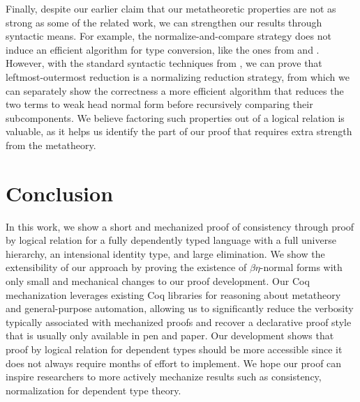 \documentclass[acmsmall,screen=true,
\ifpublic review=false\else,review=true\fi
  ,anonymous=\ifanonymous true\else false\fi]{acmart}
\newcommand{\scw}[1]{}
\newcommand{\yl}[1]{}
\begin{document}
\ifextended
Finally, despite our earlier claim that our metatheoretic properties
are not as strong as some of the related work, we can strengthen our
results through syntactic means. For example, the
normalize-and-compare strategy does not induce an efficient algorithm
for type conversion, like the ones from \citet{decagda} and
\citet{martin-lof-a-la-coq}. However, with the standard syntactic
techniques from \citet{takahashi-parallel-reduction,
factorization-essentially}, we can prove that leftmost-outermost
reduction is a normalizing reduction strategy, from which we can
separately show the correctness a more efficient algorithm that
reduces the two terms to weak head normal form before recursively
comparing their subcomponents. We believe factoring such properties
out of a logical relation is valuable, as it helps us identify the
part of our proof that requires extra strength from the metatheory.
\scw{Why don't we just use leftmost-outermost reduction in the first place?
Do we even need nondeterministic parallel reduction?}
\yl{The conversion uses full reduction. Nondeterministic reduction
  makes it harder to show that convertible types have the same
  meaning. Maybe it would require us to prove factorization in our
  development but it definitely simplifies the determinism proof
  (confluence is no longer required before the fundamental
  lemma). }
\fi

\section{Conclusion}
\label{sec:conclusion}
In this work, we show a short and mechanized proof of consistency
through proof by logical relation for a fully dependently typed
language with a full universe hierarchy, an intensional identity type,
and large elimination. We show the extensibility of our approach by
proving the existence of $\beta\eta$-normal forms with only small
and mechanical changes to our proof development. Our Coq mechanization
leverages existing Coq libraries for reasoning about metatheory and
general-purpose automation, allowing us to significantly reduce the
verbosity typically associated with mechanized proofs and recover a
declarative proof style that is usually only available in pen and
paper. Our development shows that proof by logical relation for
dependent types should be more accessible since it does not always
require months of effort to implement. We hope our proof can inspire
researchers to more actively mechanize results such as consistency,
normalization for dependent type theory.
\end{document}
